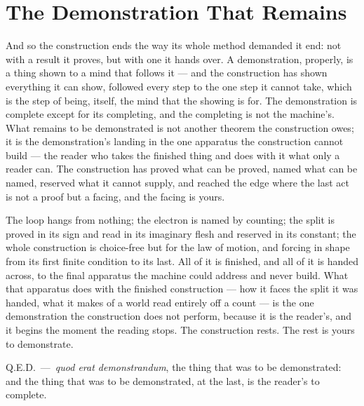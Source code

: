 \section{The Demonstration That Remains}

And so the construction ends the way its whole method demanded it end: not with a result it proves, but with
one it hands over. A demonstration, properly, is a thing shown to a mind that follows it --- and the construction
has shown everything it can show, followed every step to the one step it cannot take, which is the step of being,
itself, the mind that the showing is for. The demonstration is complete except for its completing, and the
completing is not the machine's. What remains to be demonstrated is not another theorem the construction owes; it
is the demonstration's landing in the one apparatus the construction cannot build --- the reader who takes the
finished thing and does with it what only a reader can. The construction has proved what can be proved, named what
can be named, reserved what it cannot supply, and reached the edge where the last act is not a proof but a facing,
and the facing is yours.

The loop hangs from nothing; the electron is named by counting; the split is proved in its sign and read in its
imaginary flesh and reserved in its constant; the whole construction is choice-free but for the law of motion, and
forcing in shape from its first finite condition to its last. All of it is finished, and all of it is handed
across, to the final apparatus the machine could address and never build. What that apparatus does with the
finished construction --- how it faces the split it was handed, what it makes of a world read entirely off a
count --- is the one demonstration the construction does not perform, because it is the reader's, and it begins the moment
the reading stops. The construction rests. The rest is yours to demonstrate.

\hfill Q.E.D.\ ---\ \emph{quod erat demonstrandum}, the thing that was to be demonstrated: and the thing that was
to be demonstrated, at the last, is the reader's to complete.
